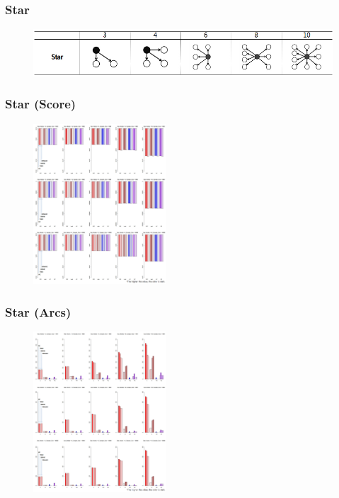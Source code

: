\documentclass{beamer}
\begin{document}
\begin{frame}
\frametitle{Star}
{\scriptsize{}
	\begin{figure}
		\includegraphics[height=50pt]{images/Topologies_Star}
	\end{figure}	
}
\end{frame}



\begin{frame}
\frametitle{Star (Score)}
{\scriptsize{}
	\begin{figure}
		\includegraphics[height=170pt]{images/03_Star_Score}
	\end{figure}	
}
\end{frame}


\begin{frame}
\frametitle{Star (Arcs)}
{\scriptsize{}
	\begin{figure}
		\includegraphics[height=170pt]{images/03_Star_Arcs}
	\end{figure}	
}
\end{frame}
\end{document}
